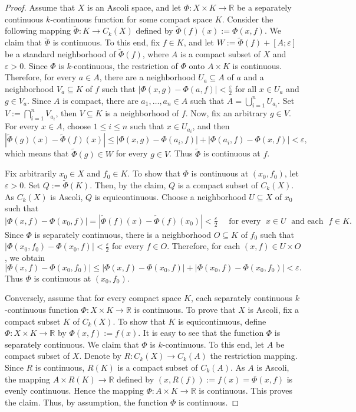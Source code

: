 \documentclass[preprint,11pt]{elsarticle}
\numberwithin{equation}{section}
\numberwithin{theorem}{section}
\newcommand{\e}{\varepsilon}
\newcommand{\IR}{\mathbb{R}}
\newcommand{\CC}{C_k}
\begin{document}
\begin{proof}
Assume that $X$ is an Ascoli space, and let $\Phi:X\times K\to \IR$ be a separately continuous $k$-continuous function for some compact space $K$. Consider the following mapping $\tilde\Phi: K\to \CC(X)$ defined by $\tilde\Phi(f)(x):=\Phi(x,f)$. We claim that $\tilde\Phi$ is continuous. To this end, fix $f\in K$, and let $W:=\tilde\Phi(f)+[A;\e]$ be a standard neighborhood of $\tilde\Phi(f)$, where  $A$ is a compact subset of $X$ and $\e>0$. Since $\Phi$ is $k$-continuous, the restriction of $\Phi$ onto $A\times K$ is continuous. Therefore, for every $a\in A$, there are a neighborhood $U_a\subseteq A$ of $a$ and a neighborhood $V_a\subseteq K$ of $f$ such that $|\Phi(x,g)-\Phi(a,f)|<\tfrac{\e}{2}$ for all $x\in U_a$ and $g\in V_a$. Since $A$ is compact, there are $a_1,\dots,a_n\in A$ such that $A=\bigcup_{i=1}^n U_{a_i}$. Set $V:=\bigcap_{i=1}^n V_{a_i}$, then $V\subseteq K$ is a neighborhood of $f$. Now, fix an arbitrary $g\in V$. For every $x\in A$, choose $1\leq i\leq n$ such that $x\in U_{a_i}$, and then
\[
|\tilde\Phi(g)(x)-\tilde\Phi(f)(x)|\leq |\Phi(x,g)-\Phi(a_i,f)|+|\Phi(a_i,f)-\Phi(x,f)|<\e,
\]
which means that  $\tilde\Phi(g)\in W$ for every $g\in V$. Thus $\tilde \Phi$ is continuous at $f$.

Fix arbitrarily $x_0\in X$ and $f_0\in K$. To show that $\Phi$  is continuous at $(x_0,f_0)$, let $\e>0$. Set $Q:=\tilde\Phi(K)$. Then, by the claim, $Q$ is a compact subset of $\CC(X)$. As $\CC(X)$ is Ascoli, $Q$ is equicontinuous.  Choose a neighborhood $U\subseteq X$ of $x_0$ such that
\[
|\Phi(x,f)-\Phi(x_0,f)|=|\tilde\Phi(f)(x)-\tilde\Phi(f)(x_0)|<\tfrac{\e}{2} \quad \mbox{ for every } \; x\in U\; \mbox{ and each } \; f\in K.
\]
Since $\Phi$ is separately continuous, there is a neighborhood $O\subseteq K$ of $f_0$ such that $|\Phi(x_0,f_0)-\Phi(x_0,f)|<\tfrac{\e}{2}$ for every $f\in O$. Therefore, for each $(x,f)\in U\times O$, we obtain
\[
|\Phi(x,f)-\Phi(x_0,f_0)|\leq |\Phi(x,f)-\Phi(x_0,f)|+|\Phi(x_0,f)-\Phi(x_0,f_0)|<\e.
\]
Thus $\Phi$ is continuous at $(x_0,f_0)$.
\smallskip

Conversely, assume that for every compact space $K$, each separately continuous $k$-continuous function $\Phi:X\times K\to \IR$ is continuous. To prove that $X$ is Ascoli, fix a compact subset $K$ of $\CC(X)$. To show that $K$ is equicontinuous, define $\Phi:X\times K\to \IR$ by $\Phi(x,f):=f(x)$. It is easy to see that the function $\Phi$ is separately continuous. We claim that $\Phi$ is $k$-continuous. To this end, let $A$ be compact subset of $X$. Denote by $R:\CC(X)\to \CC(A)$ the restriction mapping. Since $R$ is continuous, $R(K)$ is a compact subset of $\CC(A)$. As $A$ is Ascoli, the mapping $A\times R(K)\to \IR$ defined by $(x,R(f)):=f(x)=\Phi(x,f)$ is evenly continuous. Hence the mapping $\Phi:A\times K\to\IR$ is continuous. This proves the claim. Thus, by assumption, the function $\Phi$ is continuous.


\end{proof}
\end{document}
